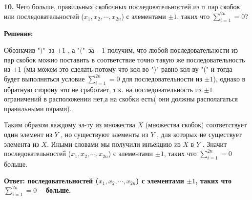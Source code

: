 \documentclass[a4paper,12pt]{article} %
\begin{document}
{\bf 10.} Чего больше, правильных скобочных последовательностей из n
пар скобок или последовательностей ($x_1, x_2, \cdots , x_{2n}$) с элементами $\pm 1$, таких что $\sum\limits_{i = 1}^{2n} = 0$?
\begin{center}
\bfseries
{\Large Решение: }
\end{center}

Обозначив "$)$"\ за $+1$ , а "$($"\ за $-1$ получим, что любой последовательности из пар скобок можно поставить в соответствие точно такую же последовательность из $\pm 1$ (мы можем это сделать потому что кол-во ")" равно кол-ву "(" и тогда будет выполняться условие $\sum\limits_{i = 1}^{2n} = 0$ для последовательности из $\pm 1$), однако в обратную сторону это не сработает, т.к. на последовательность из $\pm 1$ ограничений в расположении нет,а на скобки есть( они должны располагаться правильными парами).

Таким образом каждому эл-ту из множества $X$ (множества скобок) соответствует один элемент из $Y$ , но существуют элементы из $Y$ , для которых не существует элемента из $X$. Иными словами мы получили инъекцию из $X$ в $Y$ . Значит последовательностей ($x_1, x_2, \cdots , x_{2n}$) с элементами $\pm 1$, таких что $\sum\limits_{i = 1}^{2n} = 0$ больше.

\begin{flushright}
\begin{large}
\textbf {Ответ: последовательностей ($x_1, x_2, \cdots , x_{2n}$) с элементами $\pm 1$, таких что $\sum\limits_{i = 1}^{2n} = 0$ -- больше.}
\end{large}
\end{flushright}
\end{document}
